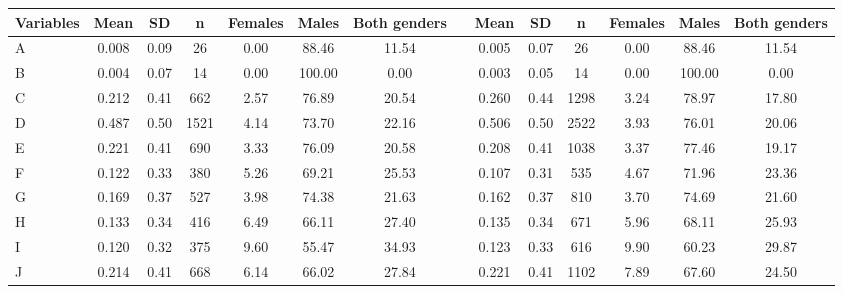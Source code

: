 \begin{tabular}{lccccccccccccc}
\toprule
    Variables &  Mean &   SD &    n & Females &  Males & Both genders &  \multicolumn{1}{l}{} &  Mean &   SD &    n & Females &  Males & Both genders \\
\midrule
\hspace{3mm}A & 0.008 & 0.09 &   26 &    0.00 &  88.46 &        11.54 &                       & 0.005 & 0.07 &   26 &    0.00 &  88.46 &        11.54 \\
\hspace{3mm}B & 0.004 & 0.07 &   14 &    0.00 & 100.00 &         0.00 &                       & 0.003 & 0.05 &   14 &    0.00 & 100.00 &         0.00 \\
\hspace{3mm}C & 0.212 & 0.41 &  662 &    2.57 &  76.89 &        20.54 &                       & 0.260 & 0.44 & 1298 &    3.24 &  78.97 &        17.80 \\
\hspace{3mm}D & 0.487 & 0.50 & 1521 &    4.14 &  73.70 &        22.16 &                       & 0.506 & 0.50 & 2522 &    3.93 &  76.01 &        20.06 \\
\hspace{3mm}E & 0.221 & 0.41 &  690 &    3.33 &  76.09 &        20.58 &                       & 0.208 & 0.41 & 1038 &    3.37 &  77.46 &        19.17 \\
\hspace{3mm}F & 0.122 & 0.33 &  380 &    5.26 &  69.21 &        25.53 &                       & 0.107 & 0.31 &  535 &    4.67 &  71.96 &        23.36 \\
\hspace{3mm}G & 0.169 & 0.37 &  527 &    3.98 &  74.38 &        21.63 &                       & 0.162 & 0.37 &  810 &    3.70 &  74.69 &        21.60 \\
\hspace{3mm}H & 0.133 & 0.34 &  416 &    6.49 &  66.11 &        27.40 &                       & 0.135 & 0.34 &  671 &    5.96 &  68.11 &        25.93 \\
\hspace{3mm}I & 0.120 & 0.32 &  375 &    9.60 &  55.47 &        34.93 &                       & 0.123 & 0.33 &  616 &    9.90 &  60.23 &        29.87 \\
\hspace{3mm}J & 0.214 & 0.41 &  668 &    6.14 &  66.02 &        27.84 &                       & 0.221 & 0.41 & 1102 &    7.89 &  67.60 &        24.50 \\

\end{tabular}
